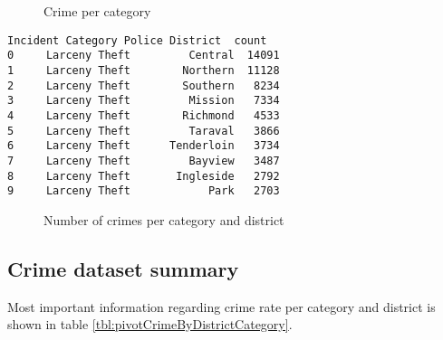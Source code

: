 \documentclass[10pt,parskip=half,
toc=sectionentrywithdots,
bibliography=totocnumbered,
captions=tableheading,numbers=noendperiod]{scrartcl}
\begin{document}
\begin{figure}[H]\begin{center}\end{center}\caption{Crime per category}\label{fig:barCrimePerCategory}\end{figure}

\begin{lstlisting}[language={},postbreak={},numbers=none,xrightmargin=7pt,breakindent=0pt,aboveskip=5pt,belowskip=5pt]
  Incident Category Police District  count
0     Larceny Theft         Central  14091
1     Larceny Theft        Northern  11128
2     Larceny Theft        Southern   8234
3     Larceny Theft         Mission   7334
4     Larceny Theft        Richmond   4533
5     Larceny Theft         Taraval   3866
6     Larceny Theft      Tenderloin   3734
7     Larceny Theft         Bayview   3487
8     Larceny Theft       Ingleside   2792
9     Larceny Theft            Park   2703
\end{lstlisting}

\begin{figure}[H]\begin{center}\end{center}\caption{Number of crimes per category and district}\label{fig:barCrimePerCategoryDistrict}\end{figure}

\begin{figure}[H]\begin{center}\end{center}\end{figure}

\hypertarget{crime-dataset-summary}{%
\subsection{Crime dataset summary}\label{crime-dataset-summary}}

Most important information regarding crime rate per category and
district is shown in table \ref{tbl:pivotCrimeByDistrictCategory}.
\end{document}

